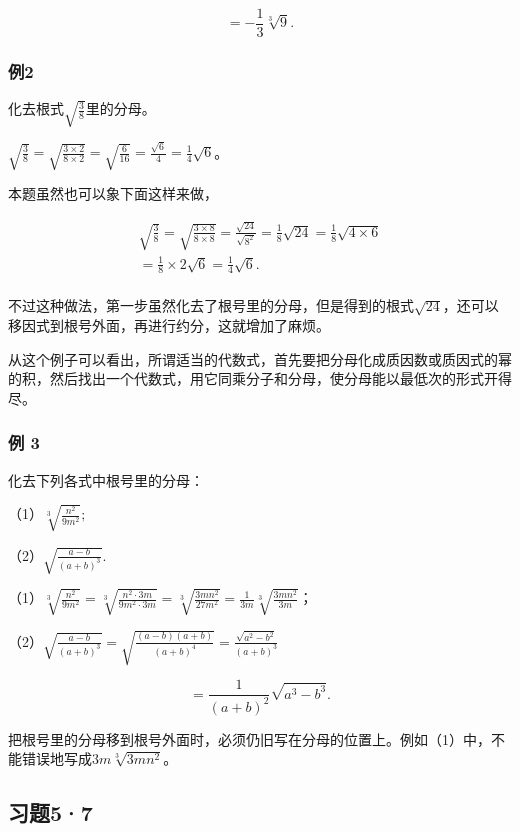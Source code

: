 \[
= - \frac{1}{3} \sqrt[3]{9}.
\]

\subsubsection{例2}

化去根式\(\sqrt{\frac{3}{8}}\)里的分母。

\(\sqrt{\frac{3}{8}} = \sqrt{\frac{3 \times 2}{8 \times 2}} = \sqrt{\frac{6}{16}} = \frac{\sqrt{6}}{4} = \frac{1}{4}\sqrt{6}\)。

 本题虽然也可以象下面这样来做，

\[
\begin{array}{l} \sqrt {\frac{3}{8}} = \sqrt {\frac{3 \times 8}{8 \times 8}} = \frac{\sqrt {24}}{\sqrt {8 ^ {2}}} = \frac{1}{8} \sqrt {24} = \frac{1}{8} \sqrt {4 \times 6} \\ = \frac{1}{8} \times 2 \sqrt {6} = \frac{1}{4} \sqrt {6}. \\ \end{array}
\]

不过这种做法，第一步虽然化去了根号里的分母，但是得到的根式\(\sqrt{24}\)，还可以移因式到根号外面，再进行约分，这就增加了麻烦。

从这个例子可以看出，所谓适当的代数式，首先要把分母化成质因数或质因式的幂的积，然后找出一个代数式，用它同乘分子和分母，使分母能以最低次的形式开得尽。

\subsubsection{例 3}

化去下列各式中根号里的分母：

（1）\(\sqrt[3]{\frac{n^2}{9m^2}};\)

（2）\(\sqrt{\frac{a - b}{(a + b)^3}}.\)

（1）\(\sqrt[3]{\frac{n^2}{9m^2}} = \sqrt[3]{\frac{n^2 \cdot 3m}{9m^2 \cdot 3m}} = \sqrt[3]{\frac{3mn^2}{27m^2}} = \frac{1}{3m} \sqrt[3]{\frac{3mn^2}{3m}}\)；

（2）\(\sqrt{\frac{a - b}{(a + b)^3}} = \sqrt{\frac{(a - b)(a + b)}{(a + b)^4}} = \frac{\sqrt{a^2 - b^2}}{(a + b)^3}\)

\[
= \frac{1}{(a + b) ^ {2}} \sqrt {a ^ {3} - b ^ {3}}.
\]

把根号里的分母移到根号外面时，必须仍旧写在分母的位置上。例如（1）中，不能错误地写成\(3m\sqrt[3]{3mn^2}\)。

\subsection{习题5·7}

